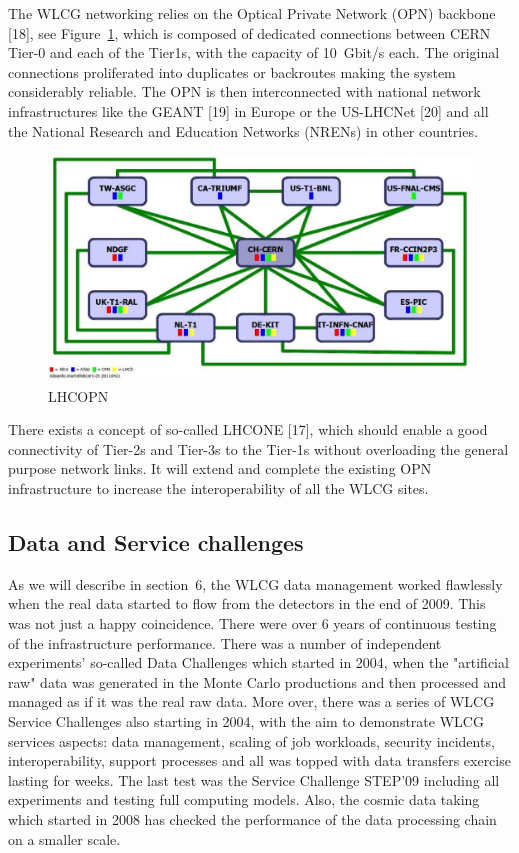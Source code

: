 The WLCG networking relies on the Optical Private Network (OPN)
backbone [18], see Figure~\ref{fig08}, which is composed of dedicated
connections between CERN Tier-0 and each of the Tier1s, with the
capacity of 10~Gbit/s each. The original connections proliferated
into duplicates or backroutes making the system considerably
reliable. The OPN is then interconnected with national network
infrastructures like the GEANT [19] in Europe or the US-LHCNet [20]
and all the National Research and Education Networks (NRENs) in
other countries.

\begin{figure}[htb] %
\centering
\includegraphics[width=13cm]{fig08.eps} %
\caption{LHCOPN}\label{fig08}
\end{figure}


There exists a concept of so-called LHCONE [17], which should enable
a good connectivity of Tier-2s and Tier-3s to the Tier-1s without
overloading the general purpose network links. It will extend and
complete the existing OPN infrastructure to increase the
interoperability of all the WLCG sites.

\subsection{Data and Service challenges}
%
As we will describe in section~6, the WLCG data management
worked flawlessly when the real data started
to flow from the detectors in the end of 2009. This was not just
a happy coincidence. There were over 6 years of continuous testing
of the infrastructure performance. There was a number of independent
experiments' so-called Data Challenges which started in 2004, when
the "artificial raw" data was generated in the Monte Carlo
productions and then processed and managed as if it was the real raw
data. More over,  there was a series of WLCG Service Challenges also
starting in 2004, with the aim to demonstrate WLCG services aspects:
data management, scaling of job workloads, security incidents,
interoperability, support processes and all was topped with data
transfers exercise lasting for weeks. The last test was the Service
Challenge STEP'09 including all experiments and testing full
computing models. Also, the cosmic data taking which started in 2008
has checked the performance of the data processing chain on a
smaller scale.

